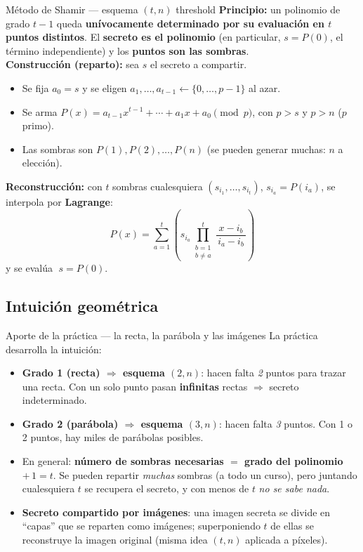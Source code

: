 \documentclass[11pt,a4paper]{article}
\begin{document}
\begin{defbox}{Método de Shamir — esquema $(t,n)$ threshold}
\textbf{Principio:} un polinomio de grado $t-1$ queda \textbf{unívocamente determinado por su
evaluación en $t$ puntos distintos}. El \textbf{secreto es el polinomio} (en particular,
$s = P(0)$, el término independiente) y los \textbf{puntos son las sombras}.\\[4pt]
\textbf{Construcción (reparto):} sea $s$ el secreto a compartir.
\begin{itemize}[leftmargin=1.4em,itemsep=1pt]
  \item Se fija $a_0 = s$ y se eligen $a_1,\dots,a_{t-1} \leftarrow \{0,\dots,p-1\}$ al azar.
  \item Se arma $P(x) = a_{t-1}x^{t-1} + \cdots + a_1 x + a_0 \pmod p$, con $p > s$ y $p > n$
        ($p$ primo).
  \item Las sombras son $P(1), P(2), \dots, P(n)$ (se pueden generar muchas: $n$ a elección).
\end{itemize}
\textbf{Reconstrucción:} con $t$ sombras cualesquiera $(s_{i_1},\dots,s_{i_t})$, $s_{i_a}=P(i_a)$,
se interpola por \textbf{Lagrange}:
\[
  P(x) = \sum_{a=1}^{t} \left( s_{i_a} \prod_{\substack{b=1\\ b\neq a}}^{t}
          \frac{x - i_b}{\,i_a - i_b\,} \right)
\]
y se evalúa $\;s = P(0)$.
\end{defbox}

\subsection{Intuición geométrica}

\begin{practbox}{Aporte de la práctica — la recta, la parábola y las imágenes}
La práctica desarrolla la intuición:
\begin{itemize}[leftmargin=1.4em,itemsep=1pt]
  \item \textbf{Grado 1 (recta) $\Rightarrow$ esquema $(2,n)$}: hacen falta \emph{2} puntos
        para trazar una recta. Con un solo punto pasan \textbf{infinitas} rectas $\Rightarrow$
        secreto indeterminado.
  \item \textbf{Grado 2 (parábola) $\Rightarrow$ esquema $(3,n)$}: hacen falta \emph{3}
        puntos. Con 1 o 2 puntos, hay miles de parábolas posibles.
  \item En general: \textbf{número de sombras necesarias $=$ grado del polinomio $+\,1 = t$}.
        Se pueden repartir \emph{muchas} sombras (a todo un curso), pero juntando cualesquiera
        $t$ se recupera el secreto, y con menos de $t$ \emph{no se sabe nada}.
  \item \textbf{Secreto compartido por imágenes}: una imagen secreta se divide en ``capas''
        que se reparten como imágenes; superponiendo $t$ de ellas se reconstruye la imagen
        original (misma idea $(t,n)$ aplicada a píxeles).
\end{itemize}
\end{practbox}
\end{document}
